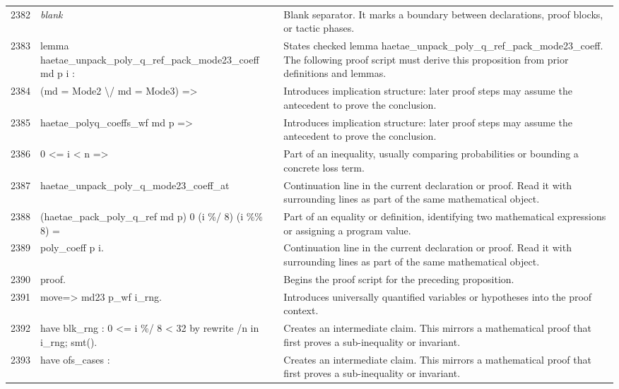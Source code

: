 \documentclass[10pt]{article}
\begin{document}
\begin{longtable}{r L{0.53\textwidth} L{0.37\textwidth}}
2382 & {\ttfamily\scriptsize \emph{blank}} & Blank separator.  It marks a boundary between declarations, proof blocks, or tactic phases. \\
2383 & {\ttfamily\scriptsize lemma haetae\_unpack\_poly\_q\_ref\_pack\_mode23\_coeff md p i :} & States checked lemma haetae\_unpack\_poly\_q\_ref\_pack\_mode23\_coeff.  The following proof script must derive this proposition from prior definitions and lemmas. \\
2384 & {\ttfamily\scriptsize   (md = Mode2 \textbackslash{}/ md = Mode3) =>} & Introduces implication structure: later proof steps may assume the antecedent to prove the conclusion. \\
2385 & {\ttfamily\scriptsize   haetae\_polyq\_coeffs\_wf md p =>} & Introduces implication structure: later proof steps may assume the antecedent to prove the conclusion. \\
2386 & {\ttfamily\scriptsize   0 <= i < n =>} & Part of an inequality, usually comparing probabilities or bounding a concrete loss term. \\
2387 & {\ttfamily\scriptsize   haetae\_unpack\_poly\_q\_mode23\_coeff\_at} & Continuation line in the current declaration or proof.  Read it with surrounding lines as part of the same mathematical object. \\
2388 & {\ttfamily\scriptsize     (haetae\_pack\_poly\_q\_ref md p) 0 (i \%/ 8) (i \%\% 8) =} & Part of an equality or definition, identifying two mathematical expressions or assigning a program value. \\
2389 & {\ttfamily\scriptsize   poly\_coeff p i.} & Continuation line in the current declaration or proof.  Read it with surrounding lines as part of the same mathematical object. \\
2390 & {\ttfamily\scriptsize proof.} & Begins the proof script for the preceding proposition. \\
2391 & {\ttfamily\scriptsize move=> md23 p\_wf i\_rng.} & Introduces universally quantified variables or hypotheses into the proof context. \\
2392 & {\ttfamily\scriptsize have blk\_rng : 0 <= i \%/ 8 < 32 by rewrite /n in i\_rng; smt().} & Creates an intermediate claim.  This mirrors a mathematical proof that first proves a sub-inequality or invariant. \\
2393 & {\ttfamily\scriptsize have ofs\_cases :} & Creates an intermediate claim.  This mirrors a mathematical proof that first proves a sub-inequality or invariant. \\

\end{longtable}
\end{document}
